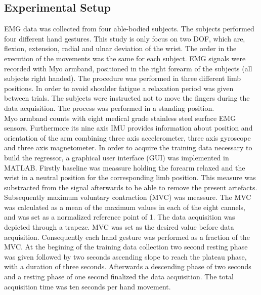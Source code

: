 \documentclass[a4paper, 10pt, conference]{ieeeconf}      %
\begin{document}
	\subsection{Experimental Setup}
EMG data was collected from four able-bodied subjects. The subjects performed four different hand gestures. This study is only focus on two DOF, which are, flexion, extension, radial and ulnar deviation of the wrist. The order in the execution of the movements was the same for each subject. EMG signals were recorded with Myo armband, positioned in the right forearm of the subjects (all subjects right handed). The procedure was performed in three different limb positions. In order to avoid shoulder fatigue a relaxation period was given between trials. The subjects were instructed not to move the fingers during the data acquisition. The process was performed in a standing position. \\ %
 Myo armband counts with eight medical grade stainless steel surface EMG sensors. %
 Furthermore its nine axis IMU provides information about position and orientation of the arm combining three axis accelerometer, three axis gyroscope and three axis magnetometer. In order to acquire the training data necessary to build the regressor, a graphical user interface (GUI) was implemented in MATLAB. Firstly baseline was meassure holding the forearm relaxed and the wrist in a neutral position for the corresponding limb position. This measure was substracted from the signal afterwards to be able to remove the present artefacts. Subsequently maximum voluntary contraction (MVC) was meassure. The MVC  was calculated as a mean of the maximum values in each of the eight cannels, and was set as a normalized reference point of 1.
 The data acquisition was depicted through a trapeze. MVC was set as the desired value before data acquisition. Consequently each hand gesture was performed as a fraction of the MVC. At the begining of the training data collection two second resting phase was given followed by two seconds ascending slope to reach the plateau phase, with a duration of three seconds. Afterwards a descending phase of two seconds and a resting phase of one second finalized the data acquisition. The total acquisition time was ten seconds per hand movement.


	
	
\end{document}
